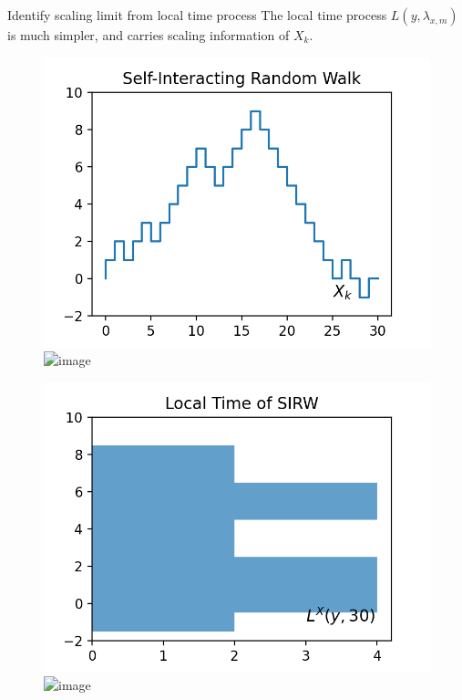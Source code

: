 \documentclass{if-beamer}
\begin{document}
\begin{frame}{Identify scaling limit from local time process}
    The local time process $L(y, \lambda_{x, m})$ is much simpler, and carries scaling information of $X_k$.

    \begin{figure}
        \centering
        \begin{minipage}{0.35\textwidth}
            \centering
            \includegraphics[width=\textwidth]{figures/sirw.png}
            \includegraphics<3->[width=\textwidth]{figures/sirwrescaled.png}
        \end{minipage}
        \begin{minipage}{0.35\textwidth}
            \centering
            \includegraphics[width=\textwidth]{figures/sirwlocal.png}
            \includegraphics<2->[width=\textwidth]{figures/sirwlocalrescaled.png}
        \end{minipage}
    \end{figure}
\end{frame}
\end{document}
